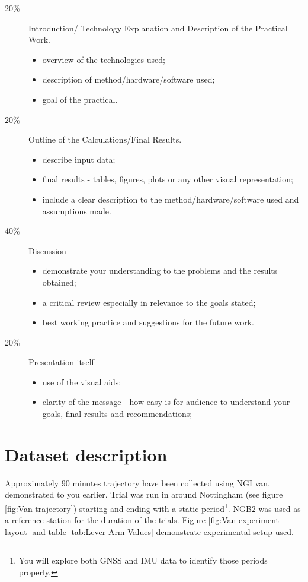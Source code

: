 \documentclass[11pt,fleqn]{book} %
\begin{document}
\begin{description}
	\item[20\%] Introduction/ Technology Explanation and Description of the Practical Work.
	\begin{itemize}
		\item overview of the technologies used;
		\item description of method/hardware/software used;
		\item goal of the practical.
	\end{itemize}
	\item[20\%] Outline of the Calculations/Final Results.
	\begin{itemize}
		\item describe input data;
		\item final results - tables, figures, plots or any other visual representation;
		\item include a clear description to the method/hardware/software used and assumptions made.
	\end{itemize}
	\item[40\%] Discussion
		\begin{itemize}
			\item demonstrate your understanding to the problems and the results obtained;
			\item a critical review especially in relevance to the goals stated;
			\item best working practice and suggestions for the future work.
		\end{itemize}
	\item[20\%] Presentation itself
	\begin{itemize}
		\item use of the visual aids;
		\item clarity of the message - how easy is for audience to understand your goals, final results and recommendations;
	\end{itemize}
\end{description}


\section{Dataset description}

Approximately 90 minutes trajectory have been collected using NGI van, demonstrated to you earlier. Trial was run in around Nottingham (see figure \ref{fig:Van-trajectory}) starting and ending with a static period\footnote{You will explore both GNSS and IMU data to identify those periods properly.}. NGB2 was used as a reference station for the duration of the trials.
Figure \ref{fig:Van-experiment-layout} and table \ref{tab:Lever-Arm-Values} demonstrate experimental setup used.
\end{document}

